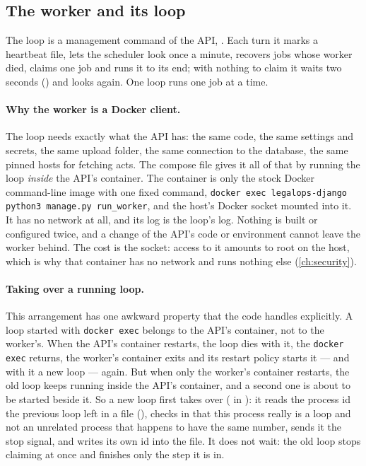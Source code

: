 \subsection{The worker and its loop}

The loop is a management command of the API, . Each turn it marks a
heartbeat file, lets the scheduler look once a minute, recovers jobs whose worker died,
claims one job and runs it to its end; with nothing to claim it waits two seconds
() and looks again. One loop runs one job at a time.

\paragraph{Why the worker is a Docker client.} The loop needs exactly what the API has: the
same code, the same settings and secrets, the same upload folder, the same connection to the
database, the same pinned hosts for fetching acts. The compose file gives it all of that by
running the loop \emph{inside} the API's container. The container 
is only the stock Docker command-line image with one fixed command, \texttt{docker exec legalops-django python3 manage.py run\_worker}, and the host's Docker socket mounted into
it. It has no network at all, and its log is the loop's log. Nothing is built or configured
twice, and a change of the API's code or environment cannot leave the worker behind. The
cost is the socket: access to it amounts to root on the host, which is why that container
has no network and runs nothing else (\cref{ch:security}).

\paragraph{Taking over a running loop.} This arrangement has one awkward property that the
code handles explicitly. A loop started with \texttt{docker exec} belongs to the API's
container, not to the worker's. When the API's container restarts, the loop dies with it,
the \texttt{docker exec} returns, the worker's container exits and its restart policy starts
it --- and with it a new loop --- again. But when only the worker's container restarts, the
old loop keeps running inside the API's container, and a second one is about to be started
beside it. So a new loop first takes over ( in
): it
reads the process id the previous loop left in a file (), checks in
 that this process really is a  loop and not an unrelated
process that happens to have the same number, sends it the stop signal, and writes its own id
into the file. It does not wait: the old loop stops claiming at once and finishes only the
step it is in.

